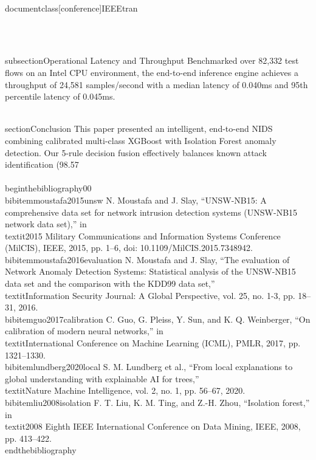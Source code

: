 \\documentclass[conference]{IEEEtran}
\begin{document}
\

\\subsection{Operational Latency and Throughput}
Benchmarked over 82,332 test flows on an Intel CPU environment, the end-to-end inference engine achieves a throughput of 24,581 samples/second with a median latency of 0.040ms and 95th percentile latency of 0.045ms.

\\section{Conclusion}
This paper presented an intelligent, end-to-end NIDS combining calibrated multi-class XGBoost with Isolation Forest anomaly detection. Our 5-rule decision fusion effectively balances known attack identification (98.57\\%

\
\\begin{thebibliography}{00}
\\bibitem{moustafa2015unsw} N. Moustafa and J. Slay, ``UNSW-NB15: A comprehensive data set for network intrusion detection systems (UNSW-NB15 network data set),'' in \\textit{2015 Military Communications and Information Systems Conference (MilCIS)}, IEEE, 2015, pp. 1--6, doi: 10.1109/MilCIS.2015.7348942.
\\bibitem{moustafa2016evaluation} N. Moustafa and J. Slay, ``The evaluation of Network Anomaly Detection Systems: Statistical analysis of the UNSW-NB15 data set and the comparison with the KDD99 data set,'' \\textit{Information Security Journal: A Global Perspective}, vol. 25, no. 1-3, pp. 18--31, 2016.
\\bibitem{guo2017calibration} C. Guo, G. Pleiss, Y. Sun, and K. Q. Weinberger, ``On calibration of modern neural networks,'' in \\textit{International Conference on Machine Learning (ICML)}, PMLR, 2017, pp. 1321--1330.
\\bibitem{lundberg2020local} S. M. Lundberg et al., ``From local explanations to global understanding with explainable AI for trees,'' \\textit{Nature Machine Intelligence}, vol. 2, no. 1, pp. 56--67, 2020.
\\bibitem{liu2008isolation} F. T. Liu, K. M. Ting, and Z.-H. Zhou, ``Isolation forest,'' in \\textit{2008 Eighth IEEE International Conference on Data Mining}, IEEE, 2008, pp. 413--422.
\\end{thebibliography}

\
\end{document}
